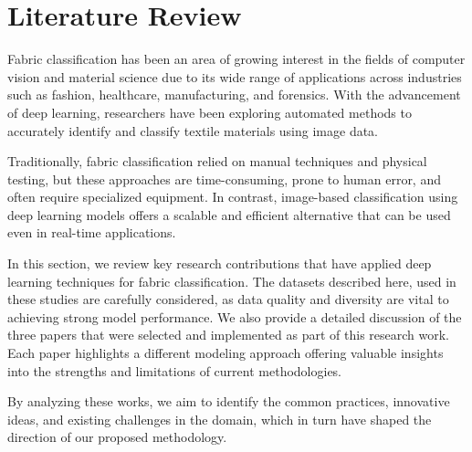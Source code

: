 \section{Literature Review}

Fabric classification has been an area of growing interest in the fields of computer vision and material science due to its wide range of applications across industries such as fashion, healthcare, manufacturing, and forensics. With the advancement of deep learning, researchers have been exploring automated methods to accurately identify and classify textile materials using image data.

Traditionally, fabric classification relied on manual techniques and physical testing, but these approaches are time-consuming, prone to human error, and often require specialized equipment. In contrast, image-based classification using deep learning models offers a scalable and efficient alternative that can be used even in real-time applications.

In this section, we review key research contributions that have applied deep learning techniques for fabric classification. The datasets described here, used in these studies are carefully considered, as data quality and diversity are vital to achieving strong model performance. We also provide a detailed discussion of the three papers that were selected and implemented as part of this research work. Each paper highlights a different modeling approach offering valuable insights into the strengths and limitations of current methodologies.

By analyzing these works, we aim to identify the common practices, innovative ideas, and existing challenges in the domain, which in turn have shaped the direction of our proposed methodology.